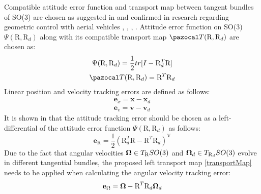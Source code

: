 Compatible attitude error function and transport map between tangent bundles of SO(3) are chosen as suggested in \cite{bulloBook} and confirmed in research regarding geometric control with aerial vehicles \cite{LeeClanak1}, \cite{LeeClanak2}, \cite{LeeClanak3}, \cite{LeeClanak4}. Attitude error function on SO(3) $	\Psi(\text{R}, \text{R}_d)$  along with its compatible transport map $\Ta(\text{R}, \text{R}_d)$ are chosen as:
\begin{gather}
	\Psi(\text{R}, \text{R}_d) = \frac{1}{2}tr[I - \text{R}_d^T\text{R}] \label{attErr} \\ 
	\Ta(\text{R}, \text{R}_d) = \text{R}^T \text{R}_d \label{transportMap}
\end{gather}
Linear position and velocity tracking errors are defined as follows:
\begin{gather}
	\textbf{e}_x = \textbf{x} - \textbf{x}_d \\
	\textbf{e}_v = \textbf{v} - \textbf{v}_d \label{linear_error}
\end{gather}
It is shown in \cite{bulloBook} that the attitude tracking error should be chosen as a left-differential of the attitude error function $\Psi(\text{R}, \text{R}_d)$ as follows:
\begin{equation}
	\textbf{e}_\text{R} = \frac{1}{2}(\text{R}_d^T\text{R} - \text{R}^T\text{R}_d)^\text{V}
\end{equation}
Due to the fact that angular velocities $\boldsymbol{\Omega} \in T_\text{R}SO(3)$ and $\boldsymbol{\Omega}_d \in T_{\text{R}_d}SO(3)$ evolve in different tangential bundles, the proposed left transport map \eqref{transportMap} needs to be applied when calculating the angular velocity tracking error:
\begin{equation}
	\textbf{e}_\Omega = \boldsymbol{\Omega} - \text{R}^T\text{R}_d\boldsymbol{\Omega}_d \label{angular_error}
\end{equation}

